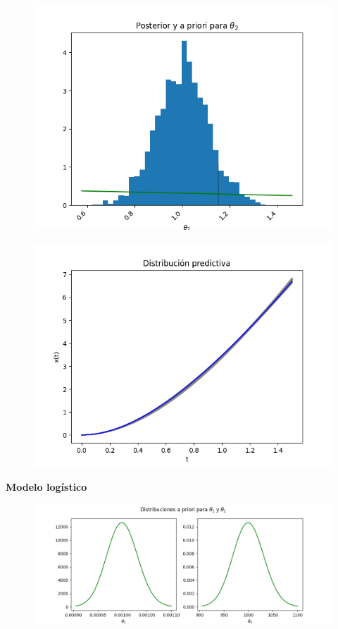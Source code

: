 \begin{figure}[H] 
    \centering 
    \includegraphics[width = 10 cm ]{img/Exp_Central_gravedad_sigma/Figuras/Generales/Post_theta2_gravedad_sigma.png} 
\end{figure} 


\begin{figure}[H] 
    \centering 
    \includegraphics[width = 10 cm ]{img/Exp_Central_gravedad_sigma/Figuras/Generales/Predictiva_gravedad_sigma.png} 
\end{figure} 

\textbf{Modelo logístico}


\begin{figure}[H] 
    \centering 
    \includegraphics[width = 15 cm]{img/Exp_Central_logistico/Figuras/Generales/Apriori_logistico.png}     
\end{figure} 

